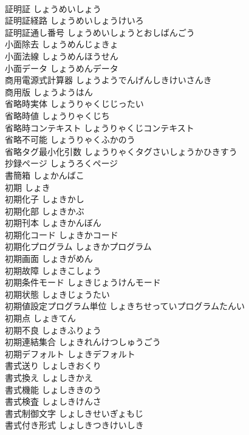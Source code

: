 \documentclass[8pt]{extreport}
\begin{document}
\begin{CJK}{UTF8}{min}
\\	証明証	しょうめいしょう	
\\	証明証経路	しょうめいしょうけいろ	
\\	証明証通し番号	しょうめいしょうとおしばんごう	
\\	小面除去	しょうめんじょきょ	
\\	小面法線	しょうめんほうせん	
\\	小面データ	しょうめんデータ	
\\	商用電源式計算器	しょうようでんげんしきけいさんき	
\\	商用版	しょうようはん	
\\	省略時実体	しょうりゃくじじったい	
\\	省略時値	しょうりゃくじち	
\\	省略時コンテキスト	しょうりゃくじコンテキスト	
\\	省略不可能	しょうりゃくふかのう	
\\	省略タグ最小化引数	しょうりゃくタグさいしょうかひきすう	
\\	抄録ページ	しょうろくページ	
\\	書簡箱	しょかんばこ	
\\	初期	しょき	
\\	初期化子	しょきかし	
\\	初期化部	しょきかぶ	
\\	初期刊本	しょきかんぼん	
\\	初期化コード	しょきかコード	
\\	初期化プログラム	しょきかプログラム	
\\	初期画面	しょきがめん	
\\	初期故障	しょきこしょう	
\\	初期条件モード	しょきじょうけんモード	
\\	初期状態	しょきじょうたい	
\\	初期値設定プログラム単位	しょきちせっていプログラムたんい	
\\	初期点	しょきてん	
\\	初期不良	しょきふりょう	
\\	初期連結集合	しょきれんけつしゅうごう	
\\	初期デフォルト	しょきデフォルト	
\\	書式送り	しょしきおくり	
\\	書式換え	しょしきかえ	
\\	書式機能	しょしききのう	
\\	書式検査	しょしきけんさ	
\\	書式制御文字	しょしきせいぎょもじ	
\\	書式付き形式	しょしきつきけいしき	

\end{CJK}
\end{document}
